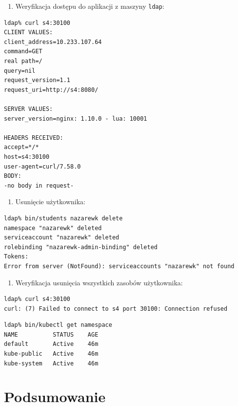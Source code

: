 \documentclass[a4paper,12pt,twoside,openany]{report}
\providecommand{\tightlist}{%
  \setlength{\itemsep}{0pt}\setlength{\parskip}{0pt}}
\newcommand{\passthrough}[1]{#1}
\begin{document}
\begin{enumerate}
\def\labelenumi{\arabic{enumi}.}
\setcounter{enumi}{9}
\tightlist
\item
  Weryfikacja dostępu do aplikacji z maszyny
  \passthrough{\lstinline!ldap!}:
\end{enumerate}

\begin{lstlisting}
ldap% curl s4:30100
CLIENT VALUES:
client_address=10.233.107.64
command=GET
real path=/
query=nil
request_version=1.1
request_uri=http://s4:8080/

SERVER VALUES:
server_version=nginx: 1.10.0 - lua: 10001

HEADERS RECEIVED:
accept=*/*
host=s4:30100
user-agent=curl/7.58.0
BODY:
-no body in request-
\end{lstlisting}

\begin{enumerate}
\def\labelenumi{\arabic{enumi}.}
\setcounter{enumi}{10}
\tightlist
\item
  Usunięcie użytkownika:
\end{enumerate}

\begin{lstlisting}
ldap% bin/students nazarewk delete
namespace "nazarewk" deleted
serviceaccount "nazarewk" deleted
rolebinding "nazarewk-admin-binding" deleted
Tokens:
Error from server (NotFound): serviceaccounts "nazarewk" not found
\end{lstlisting}

\begin{enumerate}
\def\labelenumi{\arabic{enumi}.}
\setcounter{enumi}{11}
\tightlist
\item
  Weryfikacja usunięcia wszystkich zasobów użytkownika:
\end{enumerate}

\begin{lstlisting}
ldap% curl s4:30100
curl: (7) Failed to connect to s4 port 30100: Connection refused
\end{lstlisting}

\begin{lstlisting}
ldap% bin/kubectl get namespace 
NAME          STATUS    AGE
default       Active    46m
kube-public   Active    46m
kube-system   Active    46m
\end{lstlisting}

\hypertarget{podsumowanie}{%
\chapter{Podsumowanie}\label{podsumowanie}}
\end{document}
